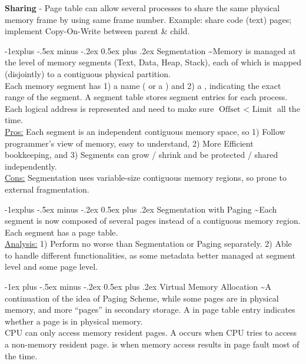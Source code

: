 \documentclass[10pt,landscape,letterpaper]{article}
\makeatletter
\renewcommand{\section}{\@startsection{section}{1}{0mm}%
                                {-1ex plus -.5ex minus -.2ex}%
                                {0.5ex plus .2ex}%
                                {\sffamily\large}}
\renewcommand{\subsection}{\@startsection{subsection}{2}{0mm}%
                                {-1explus -.5ex minus -.2ex}%
                                {0.5ex plus .2ex}%
                                {\sffamily\normalsize\itshape}}
\makeatother
\begin{document}
\begin{multicols}{3}
\medskip

\textbf{Sharing} - Page table can allow several processes to share the same physical memory frame by using same frame number. Example: share code (text) pages; implement Copy-On-Write between parent \& child.

\subsection{Segmentation}
 \textasciitilde Memory is managed at the level of memory segments (Text, Data, Heap, Stack), each of which is mapped (disjointly) to a contiguous physical partition. 
\\
Each memory segment has 1) a name ( or a ) and 2) a , indicating the exact range of the segment. A segment table stores segment entries for each process. Each logical address is represented  and need to make sure $\text{Offset $<$ Limit}$ all the time.
\\
\underline{Pros:} Each segment is an independent contiguous memory space, so 1) Follow programmer's view of memory, easy to understand, 2) More Efficient bookkeeping, and 3) Segments can grow / shrink and be protected / shared independently.
\\
\underline{Cons:} Segmentation uses variable-size contiguous memory regions, so prone to external fragmentation.

\subsection{Segmentation with Paging}
 \textasciitilde Each segment is now composed of several pages instead of a contiguous memory region. Each segment has a page table.
\\
\underline{Analysis:} 1) Perform no worse than Segmentation or Paging separately. 2) Able to handle different functionalities, as some metadata better managed at segment level and some page level.




\section{Virtual Memory Allocation}
 \textasciitilde A continuation of the idea of Paging Scheme, while some pages are in physical memory, and more “pages” in secondary storage. A  in page table entry indicates whether a page is in physical memory.
\\
CPU can only access memory resident pages. A  occurs when CPU tries to access a non-memory resident page.  is when memory access results in page fault most of the time.


\end{multicols}
\end{document}
